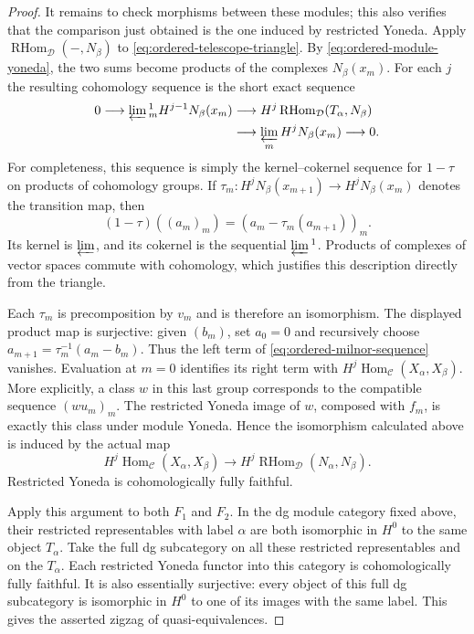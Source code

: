 \documentclass[11pt]{article}
\numberwithin{equation}{section}
\theoremstyle{definition}
\theoremstyle{remark}
\begin{document}
\begin{proof}
It remains to check morphisms between these modules; this also verifies
that the comparison just obtained is the one induced by restricted
Yoneda.  Apply $\operatorname{RHom}_{\mathcal D}(-,N_\beta)$ to
\eqref{eq:ordered-telescope-triangle}.  By
\eqref{eq:ordered-module-yoneda}, the two sums become products of the
complexes $N_\beta(x_m)$.  For each $j$ the resulting cohomology sequence
is the short exact sequence
\begin{equation}
\begin{split}
 0\longrightarrow
 \varprojlim{}^1_m H^{j-1}N_\beta(x_m)
 &\longrightarrow H^j\operatorname{RHom}_{\mathcal D}(T_\alpha,N_\beta)\\
 &\longrightarrow \varprojlim_m H^jN_\beta(x_m)
 \longrightarrow0.
\end{split}
\label{eq:ordered-milnor-sequence}
\end{equation}
For completeness, this sequence is simply the kernel--cokernel sequence
for $1-\tau$ on products of cohomology groups.  If
$\tau_m:H^jN_\beta(x_{m+1})\to H^jN_\beta(x_m)$ denotes the transition
map, then
\[
 (1-\tau)((a_m)_m)=(a_m-\tau_m(a_{m+1}))_m.
\]
Its kernel is $\varprojlim$, and its cokernel is the sequential
$\varprojlim{}^1$.  Products of complexes of vector spaces commute with
cohomology, which justifies this description directly from the triangle.

Each $\tau_m$ is precomposition by $v_m$ and is therefore an
isomorphism.  The displayed product map is surjective: given $(b_m)$,
set $a_0=0$ and recursively choose
$a_{m+1}=\tau_m^{-1}(a_m-b_m)$.  Thus the left term of
\eqref{eq:ordered-milnor-sequence} vanishes.  Evaluation at $m=0$
identifies its right term with
$H^j\operatorname{Hom}_{\mathcal C}(X_\alpha,X_\beta)$.
More explicitly, a class $w$ in this last group corresponds to the
compatible sequence $(w u_m)_m$.  The restricted Yoneda image of $w$,
composed with $f_m$, is exactly this class under module Yoneda.  Hence
the isomorphism calculated above is induced by the actual map
\[
 H^j\operatorname{Hom}_{\mathcal C}(X_\alpha,X_\beta)
 \longrightarrow
 H^j\operatorname{RHom}_{\mathcal D}(N_\alpha,N_\beta).
\]
Restricted Yoneda is cohomologically fully faithful.

Apply this argument to both $F_1$ and $F_2$.  In the dg module category
fixed above, their restricted representables with label $\alpha$
are both isomorphic in $H^0$ to the same object $T_\alpha$.  Take the full dg
subcategory on all these restricted representables and on the
$T_\alpha$.  Each restricted Yoneda functor into this category is
cohomologically fully faithful.  It is also essentially surjective:
every object of this full dg subcategory is isomorphic in $H^0$ to one
of its images with the same label.  This gives the asserted zigzag of
quasi-equivalences.
\end{proof}
\end{document}
